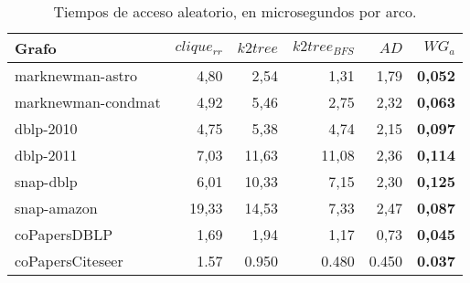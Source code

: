 \begin{table}
	\caption{Tiempos de acceso aleatorio, en microsegundos por arco.}
	\label{table:timesRandom}
	\centering
	\begin{tabular}{l|r|r|r|r|r}
		\toprule
		Grafo & $clique_{rr}$ & $k2tree$ & $k2tree_{BFS}$ & $AD$ & $WG_{a}$ \\
		\midrule	
		marknewman-astro & 4,80 & 2,54 & 1,31 & 1,79 & \textbf{0,052} \\
		marknewman-condmat & 4,92 & 5,46 & 2,75 & 2,32 & \textbf{0,063} \\
		dblp-2010 & 4,75 & 5,38 & 4,74 & 2,15 & \textbf{0,097} \\
         dblp-2011 & 7,03 & 11,63 & 11,08 & 2,36 & \textbf{0,114} \\
		snap-dblp & 6,01 & 10,33 & 7,15 & 2,30 & \textbf{0,125} \\
         snap-amazon & 19,33 & 14,53 & 7,33 & 2,47 & \textbf{0,087} \\
         coPapersDBLP & 1,69 & 1,94 & 1,17 & 0,73 & \textbf{0,045} \\
         coPapersCiteseer & 1.57 & 0.950 & 0.480 & 0.450 & \textbf{0.037} \\
         \bottomrule
	\end{tabular}
\end{table}
